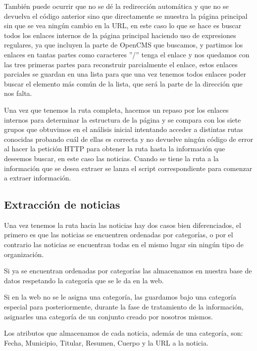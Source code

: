 También puede ocurrir que no se dé la redirección automática y que no se devuelva el código anterior sino que directamente se muestra la página principal sin que se vea ningún cambio en la URL, en este caso lo que se hace es buscar todos los enlaces internos de la página principal haciendo uso de expresiones regulares, ya que incluyen la parte de OpenCMS que buscamos, y partimos los enlaces en tantas partes como caracteres ''/'' tenga el enlace y nos quedamos con las tres primeras partes para reconstruir parcialmente el enlace, estos enlaces parciales se guardan en una lista para que una vez tenemos todos enlaces poder buscar el elemento más común de la lista, que será la parte de la dirección que nos falta.

Una vez que tenemos la ruta completa, hacemos un repaso por los enlaces internos para determinar la estructura de la página y se compara con los siete grupos que obtuvimos en el análisis inicial intentando acceder a distintas rutas conocidas probando cuál de ellas es correcta y no devuelve ningún código de error al hacer la petición HTTP para obtener la ruta hasta la información que deseemos buscar, en este caso las noticias. Cuando se tiene la ruta a la información que se desea extraer se lanza el script correspondiente para comenzar a extraer información.

\subsection{Extracción de noticias}

Una vez tenemos la ruta hacia las noticias hay dos casos bien diferenciados, el primero es que las noticias se encuentren ordenadas por categorías, o por el contrario las noticias se encuentran todas en el mismo lugar sin ningún tipo de organización.

Si ya se encuentran ordenadas por categorías las almacenamos en nuestra base de datos respetando la categoría que se le da en la web. 

Si en la web no se le asigna una categoría, las guardamos bajo una categoría especial para posteriormente, durante la fase de tratamiento de la información, asignarles una categoría de un conjunto creado por nosotros mismos. 

Los atributos que almacenamos de cada noticia, además de una categoría, son: Fecha, Municipio, Titular, Resumen, Cuerpo y la URL a la noticia.

